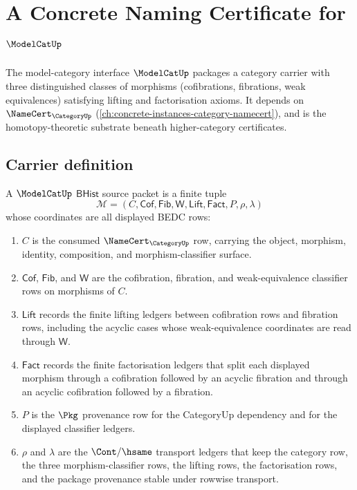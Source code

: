 \chapter{A Concrete Naming Certificate for $\ModelCatUp$}
\label{ch:concrete-instances-modelcat-namecert}

The model-category interface $\ModelCatUp$ packages a category carrier with three distinguished classes of morphisms (cofibrations, fibrations, weak equivalences) satisfying lifting and factorisation axioms. It depends on $\NameCert_{\CategoryUp}$ (\autoref{ch:concrete-instances-category-namecert}), and is the homotopy-theoretic substrate beneath higher-category certificates.

\section{Carrier definition}
\label{sec:modelcat-carrier}

\begin{definition}
\label{def:modelcat-bhist-source-packet}
A $\ModelCatUp$ $\mathsf{BHist}$ source packet is a finite tuple
$$
\mathcal{M}=(C,\mathsf{Cof},\mathsf{Fib},\mathsf{W},\mathsf{Lift},\mathsf{Fact},P,\rho,\lambda)
$$
whose coordinates are all displayed BEDC rows:
\begin{enumerate}
\item $C$ is the consumed $\NameCert_{\CategoryUp}$ row, carrying the object,
morphism, identity, composition, and morphism-classifier surface.
\item $\mathsf{Cof}$, $\mathsf{Fib}$, and $\mathsf{W}$ are the cofibration,
fibration, and weak-equivalence classifier rows on morphisms of $C$.
\item $\mathsf{Lift}$ records the finite lifting ledgers between cofibration
rows and fibration rows, including the acyclic cases whose weak-equivalence
coordinates are read through $\mathsf{W}$.
\item $\mathsf{Fact}$ records the finite factorisation ledgers that split each
displayed morphism through a cofibration followed by an acyclic fibration and
through an acyclic cofibration followed by a fibration.
\item $P$ is the $\Pkg$ provenance row for the CategoryUp dependency and for
the displayed classifier ledgers.
\item $\rho$ and $\lambda$ are the $\Cont/\hsame$ transport ledgers that keep
the category row, the three morphism-classifier rows, the lifting rows, the
factorisation rows, and the package provenance stable under rowwise transport.
\end{enumerate}
\end{definition}

